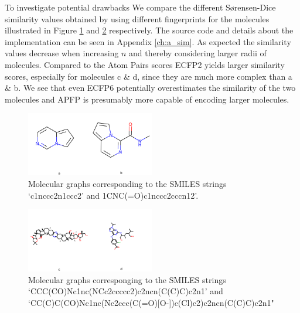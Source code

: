 To investigate potential drawbacks We compare the different Sørensen-Dice similarity values \cite{sorensen1948method, dice1945measures} obtained by using different fingerprints for the molecules illustrated in Figure \ref{fig:molsa} and \ref{fig:molsb} respectively. The source code and details about the implementation can be seen in Appendix \ref{ch:a_sim}.   As expected the similarity values decrease when increasing $n$ and thereby considering larger radii of molecules. Compared to the Atom Pairs scores ECFP2 yields larger similarity scores, especially for molecules c \& d, since they are much more complex than a \& b. We see that even ECFP6 potentially overestimates the similarity of the two molecules and APFP is presumably more capable of encoding larger molecules. 
\begin{figure}[h]
	\centering 
	\includegraphics[width=0.5\textwidth]{test1.png}
	\caption{Molecular graphs corresponding to the SMILES strings `c1nccc2n1ccc2' and 1CNC(=O)c1nccc2cccn12'.}
	\label{fig:molsa}
\end{figure}
\begin{figure}[h]
	\centering 
	\includegraphics[width=0.5\textwidth]{test2.png}
	\caption{Molecular graphs corresponging to the SMILES strings `CCC(CO)Nc1nc(NCc2ccccc2)c2ncn(C(C)C)c2n1' and `CC(C)C(CO)Nc1nc(Nc2ccc(C(=O)[O-])c(Cl)c2)c2ncn(C(C)C)c2n1" }
	\label{fig:molsb}
\end{figure}


